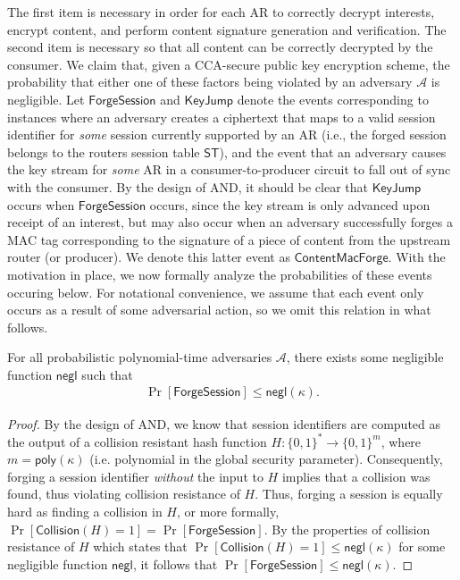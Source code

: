The first item is necessary in order for each AR to correctly decrypt interests, encrypt content, and perform content signature generation and verification. The second item is necessary so that all content can be correctly decrypted by the consumer. We claim that, given a CCA-secure public key encryption scheme, the probability that either one of these factors being violated by an adversary $\mathcal{A}$ is negligible. Let $\mathsf{ForgeSession}$ and $\mathsf{KeyJump}$ denote the events corresponding to instances where an adversary creates a ciphertext that maps to a valid session identifier for \emph{some} session currently supported by an AR (i.e., the forged session belongs to the routers session table $\mathsf{ST}$), and the event that an adversary causes the key stream for \emph{some} AR in a consumer-to-producer circuit to fall out of sync with the consumer. By the design of {\sf AND}, it should be clear that $\mathsf{KeyJump}$ occurs when $\mathsf{ForgeSession}$ occurs, since the key stream is only advanced upon receipt of an interest, but may also occur when an adversary successfully forges a MAC tag corresponding to the signature of a piece of content from the upstream router (or producer). We denote this latter event as $\mathsf{ContentMacForge}$. With the motivation in place, we now formally analyze the probabilities of these events occuring below. For notational convenience, we assume that each event only occurs as a result of some adversarial action, so we omit this relation in what follows.

\begin{lemma}
For all probabilistic polynomial-time adversaries $\mathcal{A}$, there exists some negligible function $\mathsf{negl}$ such that
\begin{align*}
\Pr[\mathsf{ForgeSession}] \leq \mathsf{negl}(\kappa).
\end{align*}
\end{lemma}
\begin{proof}
By the design of {\sf AND}, we know that session identifiers are computed as the output of a collision resistant hash function $H : \{0,1\}^* \to \{0,1\}^{m}$, where $m = \mathsf{poly}(\kappa)$ (i.e. polynomial in the global security parameter). Consequently, forging a session identifier \emph{without} the input to $H$ implies that a collision was found, thus violating collision resistance of $H$. Thus, forging a session is equally hard as finding a collision in $H$, or more formally, $\Pr[\mathsf{Collision}(H) = 1] = \Pr[\mathsf{ForgeSession}]$. By the properties of collision resistance of $H$ which states that $\Pr[\mathsf{Collision}(H) = 1] \leq \mathsf{negl}(\kappa)$ for some negligible function $\mathsf{negl}$, it follows that $\Pr[\mathsf{ForgeSession}] \leq \mathsf{negl}(\kappa)$. 

\end{proof}

